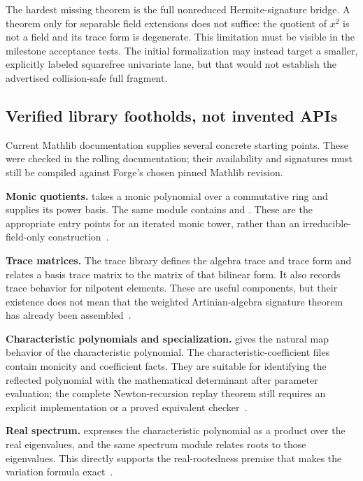 The hardest missing theorem is the full nonreduced Hermite-signature bridge. A theorem only for separable field extensions does not suffice: the quotient of $x^2$ is not a field and its trace form is degenerate. This limitation must be visible in the milestone acceptance tests. The initial formalization may instead target a smaller, explicitly labeled squarefree univariate lane, but that would not establish the advertised collision-safe full fragment.

\subsection{Verified library footholds, not invented APIs}

Current Mathlib documentation supplies several concrete starting points. These were checked in the rolling documentation; their availability and signatures must still be compiled against Forge's chosen pinned Mathlib revision.

\textbf{Monic quotients.}  takes a monic polynomial over a commutative ring and supplies its power basis. The same module contains  and . These are the appropriate entry points for an iterated monic tower, rather than an irreducible-field-only construction~\cite{mathlib-adjoinroot}.

\textbf{Trace matrices.} The trace library defines the algebra trace and trace form and relates a basis trace matrix to the matrix of that bilinear form. It also records trace behavior for nilpotent elements. These are useful components, but their existence does not mean that the weighted Artinian-algebra signature theorem has already been assembled~\cite{mathlib-trace}.

\textbf{Characteristic polynomials and specialization.}  gives the natural map behavior of the characteristic polynomial. The characteristic-coefficient files contain monicity and coefficient facts. They are suitable for identifying the reflected polynomial with the mathematical determinant after parameter evaluation; the complete Newton-recursion replay theorem still requires an explicit implementation or a proved equivalent checker~\cite{mathlib-charpoly}.

\textbf{Real spectrum.}  expresses the characteristic polynomial as a product over the real eigenvalues, and the same spectrum module relates roots to those eigenvalues. This directly supports the real-rootedness premise that makes the variation formula exact~\cite{mathlib-spectrum}.

